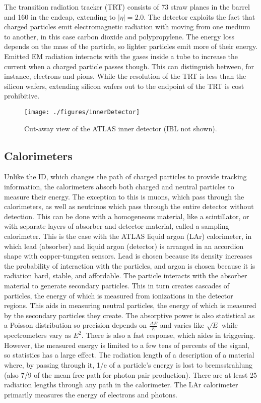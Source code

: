 The transition radiation tracker (TRT) consists of 73 straw planes in the barrel and 160 in the endcap, extending to $|\eta|=2.0$.  The detector exploits the fact that charged particles emit electromagnetic radiation with moving from one medium to another, in this case carbon dioxide and polypropylene.  The energy loss depends on the mass of the particle, so lighter particles emit more of their energy.  Emitted EM radiation interacts with the gases inside a tube to increase the current when a charged particle passes though.  This can distinguish between, for instance, electrons and pions.  While the resolution of the TRT is less than the silicon wafers, extending silicon wafers out to the endpoint of the TRT is cost prohibitive.  \\

\begin{figure}[h!]
  \centering
	\texttt{[image: ./figures/innerDetector]}
\caption{\label{fig:atlasCutAway}{ Cut-away view of the ATLAS inner detector (IBL not shown). }} %
\end{figure}

\subsection{Calorimeters}  \label{sec:calorimeters}%

Unlike the ID, which changes the path of charged particles to provide tracking information, the calorimeters absorb both charged and neutral particles to measure their energy.  The exception to this is muons, which pass through the calorimeters, as well as neutrinos which pass through the entire detector without detection.  This can be done with a homogeneous material, like a scintillator, or with separate layers of absorber and detector material, called a sampling calorimeter.  This is the case with the ATLAS liquid argon (LAr) calorimeter, in which lead (absorber) and liquid argon (detector) is arranged in an accordion shape with copper-tungsten sensors.  Lead is chosen because its density increases the probability of interaction with the particles, and argon is chosen because it is radiation hard, stable, and affordable.  The particle interacts with the absorber material to generate secondary particles.  This in turn creates cascades of particles, the energy of which is measured from ionizations in the detector regions.  This aids in measuring neutral particles, the energy of which is measured by the secondary particles they create.  The absorptive power is also statistical as a Poisson distribution so precision depends on $\frac{\Delta E}{E}$ and varies like $\sqrt{E}$ while spectrometers vary as $E^{2}$.  There is also a fast response, which aides in triggering.  However, the measured energy is limited to a few tens of percents of the signal, so statistics has a large effect.  The radiation length of a description of a material where, by passing through it, 1/e of a particle's energy is lost to bremsstrahlung (also 7/9 of the mean free path for photon pair production).  There are at least 25 radiation lengths through any path in the calorimeter.  The LAr calorimeter primarily measures the energy of electrons and photons.\\

